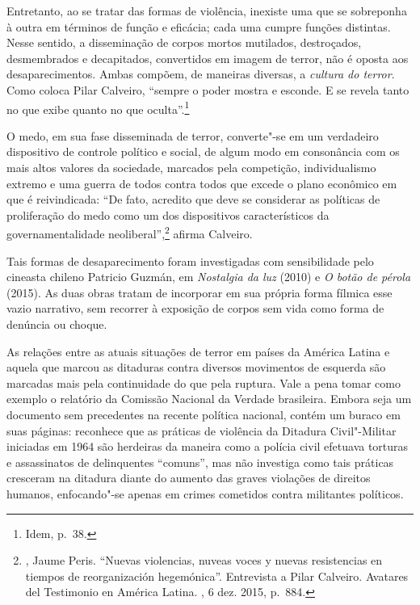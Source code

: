 Entretanto, ao se tratar das formas de violência, inexiste uma que se
sobreponha à outra em términos de função e eficácia; cada uma cumpre
funções distintas. Nesse sentido, a disseminação de corpos mortos
mutilados, destroçados, desmembrados e decapitados, convertidos em
imagem de terror, não é oposta aos desaparecimentos. Ambas compõem, de
maneiras diversas, a \emph{cultura do terror}. Como coloca Pilar
Calveiro, ``sempre o poder mostra e esconde. E se revela tanto no que
exibe quanto no que oculta''.\footnote{Idem, p.~38.}

O medo, em sua fase disseminada de terror, converte"-se em um verdadeiro
dispositivo de controle político e social, de algum modo em consonância
com os mais altos valores da sociedade, marcados pela competição,
individualismo extremo e uma guerra de todos contra todos que excede o
plano econômico em que é reivindicada: ``De fato, acredito que deve se %
considerar as políticas de proliferação do medo como um dos dispositivos
característicos da governamentalidade neoliberal'',\footnote{, Jaume
  Peris. ``Nuevas violencias, nuveas voces y nuevas resistencias en
  tiempos de reorganización hegemónica''. Entrevista a Pilar Calveiro.
  Avatares del Testimonio en América Latina. {}, 6 dez.
  2015, p.~884.} afirma Calveiro.

Tais formas de desaparecimento foram investigadas com sensibilidade pelo
cineasta chileno Patricio Guzmán, em \emph{Nostalgia da luz} (2010) e
\emph{O botão de pérola} (2015). As duas obras tratam de incorporar em
sua própria forma fílmica esse vazio narrativo, sem recorrer à exposição
de corpos sem vida como forma de denúncia ou choque.

\asterisc

As relações entre as atuais situações de terror em países da América
Latina e aquela que marcou as ditaduras contra diversos movimentos de
esquerda são marcadas mais pela continuidade do que pela ruptura. Vale a
pena tomar como exemplo o relatório da Comissão Nacional da Verdade
brasileira. Embora seja um documento sem precedentes na recente política
nacional, contém um buraco em suas páginas: reconhece que as práticas de
violência da Ditadura Civil"-Militar iniciadas em 1964 são herdeiras da
maneira como a polícia civil efetuava torturas e assassinatos de
delinquentes ``comuns'', mas não investiga como tais práticas cresceram
na ditadura diante do aumento das graves violações de direitos humanos,
enfocando"-se apenas em crimes cometidos contra militantes políticos.

